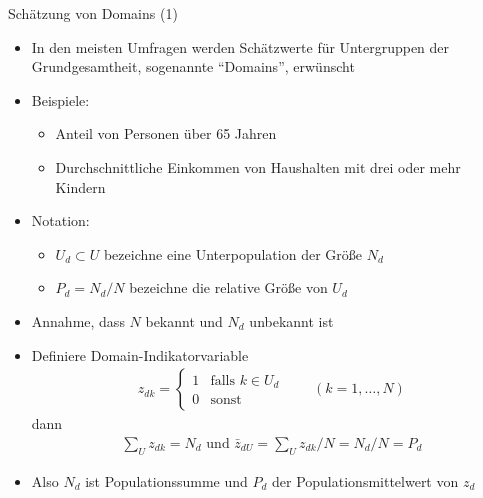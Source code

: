 \documentclass[9pt]{beamer}
\begin{document}
\begin{frame}{Schätzung von Domains (1)}
\begin{itemize}
	\item In den meisten Umfragen werden Schätzwerte für Untergruppen der Grundgesamtheit, sogenannte \enquote{Domains}, erwünscht
	\item Beispiele: 
	\begin{itemize}
		\item Anteil von Personen über 65 Jahren
		\item  Durchschnittliche Einkommen von Haushalten mit drei oder mehr Kindern
	\end{itemize}
	\item Notation:
	\begin{itemize}
		\item $U_d \subset U$ bezeichne eine Unterpopulation der Größe $N_d$
		\item $P_d = N_d/N$ bezeichne die relative Größe von $U_d$
	\end{itemize}
	\item Annahme, dass $N$ bekannt und $N_d$ unbekannt ist	
	\item Definiere Domain-Indikatorvariable
	\begin{align*}
	z_{dk}= \begin{cases}
	1 & \text{falls } k \in U_d\\
	0 & \text{sonst}
	\end{cases} \qquad (k=1,\dots,N)
	\end{align*}
	dann
	\begin{align*}
	\sum_U z_{dk} = N_d \text{ und } \bar{z}_{dU} = \sum_U z_{dk}/N = N_d/N = P_d
	\end{align*}
	\item Also $N_d$ ist Populationssumme und $P_d$ der Populationsmittelwert von $z_d$
\end{itemize}
\end{frame}
\end{document}
